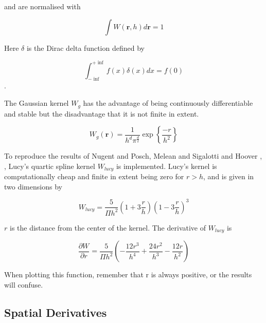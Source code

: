 and are normalised with 

\[ \int W\left(\mathbold{r},h\right) d\mathbold{r} = 1  \]

Here $\delta$ is the Dirac delta function defined by

\[ \int_{-\inf}^{+\inf} f(x) \delta(x) dx = f(0) \].

The Gaussian kernel $W_{g}$ has the advantage of being continuously
differentiable and stable \cite{morris} but the disadvantage that it is not
finite in extent.

\begin{equation}
\label{gaussian_kernel}
W_{g} \left( \mathbold{r} \right)=\frac{1}{ h^{d}\pi^{\frac{d}{2}}} 
\exp \left\{  \frac{-r}{h^{2}}  \right\}
\end{equation}


To reproduce the results of Nugent and Posch, Melean and Sigalotti and Hoover
\cite{nugent_liquid_2000} \cite{melean_coalescence_2005},
\cite{hoover_entropy_1999}, Lucy's quartic spline kernel $W_{lucy}$ is
implemented. Lucy's kernel is computationally cheap and finite in extent being
zero for $r > h$, and is given in two dimensions by

\begin{equation}
\label{lucy_kernel}
W_{lucy} = \frac{5}{\Pi h^2}\left(1 + 3\frac{r}{h}\right)\left(1 - 3\frac{r}{h}\right)^3
\end{equation}


$r$ is the distance from the center of the kernel. The derivative of $W_{lucy}$
is

\begin{equation}
\label{lucy_kernel_derivative}
\frac{\partial W}{\partial r} = \frac{5}{\Pi h^2} \left( - \frac{12r^3}{h^4} +
\frac{24r^2}{h^3} - \frac{12r}{h^2} \right)
\end{equation}

When plotting this function, remember that r is always positive, or the results
will confuse.


\subsection{Spatial Derivatives}

